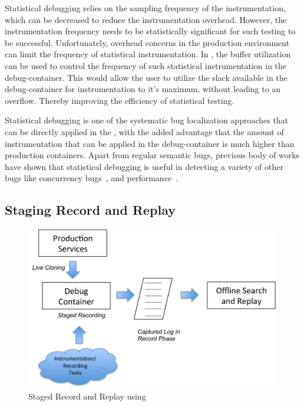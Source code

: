 Statistical debugging relies on the sampling frequency of the instrumentation, which can be decreased to reduce the instrumentation overhead.
However, the instrumentation frequency needs to be statistically significant for such testing to be successful. 
Unfortunately, overhead concerns in the production environment can limit the frequency of statistical instrumentation.
In \parikshan, the buffer utilization can be used to control the frequency of such statistical instrumentation in the debug-container. 
This would allow the user to utilize the slack available in the debug-container for instrumentation to it's maximum, without leading to an overflow. 
Thereby improving the efficiency of statistical testing.

Statistical debugging is one of the systematic bug localization approaches that can be directly applied in the \debugcontainer, with the added advantage that the amount of instrumentation that can be applied in the debug-container is much higher than production containers. 
Apart from regular semantic bugs, previous body of works have shown that statistical debugging is useful in detecting a variety of other bugs like concurrency bugs~\cite{statisticalConcurrency}, and performance~\cite{statisticalPerformance}.

\subsection{Staging Record and Replay}
\label{sec:activeStagedRecordReplay}

\begin{figure}[!ht]
	
	\centering
	\includegraphics[width=0.99\textwidth]{guided/figs/stagedRecordReplay.pdf}
	\caption{Staged Record and Replay using \parikshan}
	\label{fig:stagedRecordReplay}
\end{figure}


